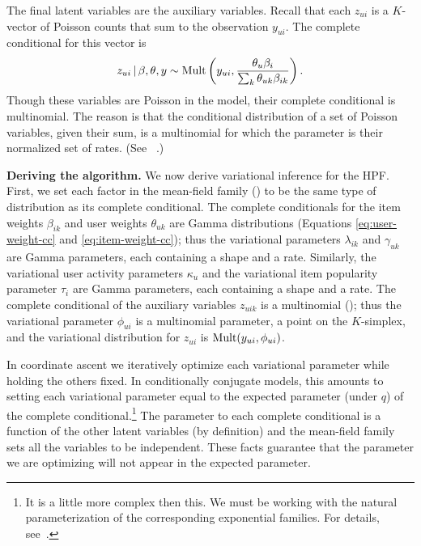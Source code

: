 The final latent variables are the auxiliary variables.  Recall that
each $z_{ui}$ is a $K$-vector of Poisson counts that sum to the
observation $y_{ui}$. The complete conditional for this vector is
\begin{equation}
  \label{eq:aux-cc}
  z_{ui} \,\vert\, \beta, \theta, y \sim \textrm{Mult}\left(y_{ui}, \frac{\theta_{u} 
      \beta_{i}}{\textstyle \sum_{k} \theta_{uk} \beta_{ik}}\right).
\end{equation}
Though these variables are Poisson in the model, their complete
conditional is multinomial.  The reason is that the conditional
distribution of a set of Poisson variables, given their sum, is a
multinomial for which the parameter is their normalized set of
rates. (See ~\cite{Johnson:2005, Cemgil:2009}.)

{\bf Deriving the algorithm.}
We now derive variational inference for the HPF. First, we set each
factor in the mean-field family () to be the same type of
distribution as its complete conditional.  The complete conditionals
for the item weights $\beta_{ik}$ and user weights $\theta_{uk}$ are
Gamma distributions (Equations \ref{eq:user-weight-cc} and
\ref{eq:item-weight-cc}); thus the variational parameters
$\lambda_{ik}$ and $\gamma_{uk}$ are Gamma parameters, each containing
a shape and a rate.  Similarly, the variational user activity
parameters $\kappa_u$ and the variational item popularity parameter
$\tau_i$ are Gamma parameters, each containing a shape and a rate.
The complete conditional of the auxiliary variables $z_{uik}$ is a
multinomial (); thus the variational parameter
$\phi_{ui}$ is a multinomial parameter, a point on the $K$-simplex,
and the variational distribution for $z_{ui}$ is $\textrm{Mult}(y_{ui},
\phi_{ui})$.

In coordinate ascent we iteratively optimize each variational
parameter while holding the others fixed.  In conditionally conjugate
models, this amounts to setting each variational parameter equal to
the expected parameter (under $q$) of the complete
conditional.\footnote{It is a little more complex then this.  We must
  be working with the natural parameterization of the corresponding
  exponential families.  For details, see~\cite{Hoffman:2013}.}  The
parameter to each complete conditional is a function of the other
latent variables (by definition) and the mean-field family sets all
the variables to be independent.  These facts guarantee that the
parameter we are optimizing will not appear in the expected parameter.

